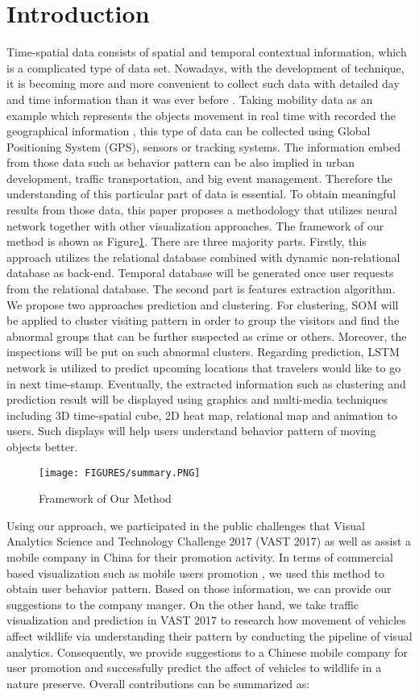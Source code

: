\documentclass[runningheads,a4paper]{llncs}
\begin{document}
\section{Introduction}
Time-spatial data consists of spatial and temporal contextual information,  which is a complicated type of data set. Nowadays, with the development of technique, it is becoming more and more convenient to collect such data with detailed day and time information than it was ever before  \cite{cnn}. Taking mobility data as an example which represents the objects movement in real time with recorded the geographical information   \cite{von2016mobilitygraphs}, this type of data can be collected using Global Positioning System (GPS), sensors or tracking systems. The information embed from those data such as behavior pattern can be also implied in urban development, traffic transportation, and big event management. Therefore the understanding of this particular part of data is essential.
To obtain meaningful results from those data, this paper proposes a methodology that utilizes neural network together with other visualization approaches. The framework of our method is shown as Figure\ref{fig:ff}. There are three majority parts. Firstly, this approach utilizes the relational database combined with dynamic non-relational database as back-end. Temporal database will be generated once user requests from the relational database. The second part is features extraction algorithm. We propose two approaches prediction and clustering. For clustering, SOM will be applied to cluster visiting pattern in order to group the visitors and find the abnormal groups that can be further suspected as crime or others. Moreover, the inspections will be put on such abnormal clusters. Regarding prediction, LSTM network is utilized to predict upcoming locations that travelers would like to go in next time-stamp. Eventually, the extracted information such as clustering and prediction result will be displayed using graphics and multi-media techniques including 3D time-spatial cube, 2D heat map, relational map and animation to users. Such displays will help users understand behavior pattern of moving objects better. 
\begin{figure}[!h]
\centering
\texttt{[image: FIGURES/summary.PNG]}
\caption{\label{fig:ff} Framework of Our Method}
\end{figure}

Using our approach, we participated in the public challenges that Visual Analytics Science and Technology Challenge 2017 (VAST 2017) as well as assist a mobile company in China for their promotion activity.  In terms of commercial based visualization such as mobile users promotion \cite{cnn}, we used this method to obtain user behavior pattern. Based on those information, we can provide our suggestions to the company manger. On the other hand, we take traffic visualization and prediction in VAST 2017 to research how movement of vehicles affect wildlife via understanding their pattern by conducting the pipeline of visual analytics. Consequently, we provide suggestions to a Chinese mobile company for user promotion and successfully predict the affect of vehicles to wildlife in a nature preserve. Overall contributions can be summarized as:
\end{document}
